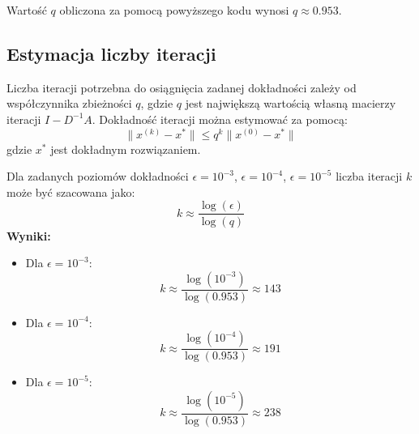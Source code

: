 \documentclass{article}
\begin{document}
Wartość \( q \) obliczona za pomocą powyższego kodu wynosi \( q \approx 0.953 \).

\subsection*{Estymacja liczby iteracji}
Liczba iteracji potrzebna do osiągnięcia zadanej dokładności zależy od współczynnika zbieżności \( q \), gdzie \( q \) jest największą wartością własną macierzy iteracji \( I - D^{-1}A \). Dokładność iteracji można estymować za pomocą:
\[
\|x^{(k)} - x^*\| \leq q^k \|x^{(0)} - x^*\|
\]
gdzie \( x^* \) jest dokładnym rozwiązaniem.

Dla zadanych poziomów dokładności \(\epsilon = 10^{-3}\), \(\epsilon = 10^{-4}\), \(\epsilon = 10^{-5}\) liczba iteracji \( k \) może być szacowana jako:
\[
k \approx \frac{\log(\epsilon)}{\log(q)}
\]
\newpage
\textbf{Wyniki:}
\begin{itemize}
    \item Dla \( \epsilon = 10^{-3} \):
    \[
    k \approx \frac{\log(10^{-3})}{\log(0.953)} \approx 143
    \]
    \item Dla \( \epsilon = 10^{-4} \):
    \[
    k \approx \frac{\log(10^{-4})}{\log(0.953)} \approx 191
    \]
    \item Dla \( \epsilon = 10^{-5} \):
    \[
    k \approx \frac{\log(10^{-5})}{\log(0.953)} \approx 238
    \]
\end{itemize}
\end{document}
